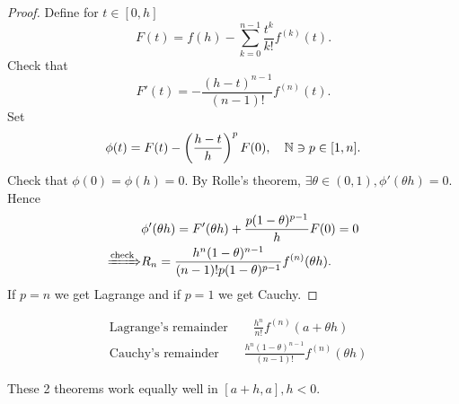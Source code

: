 \begin{proof}
    Define for $ t\in [0,h] $ 
    \[
        F(t) = f(h)-\sum_{k=0}^{n-1}\frac{t^k}{k!}f^{(k)}(t).
    \]
    Check that 
    \[
        F'(t) = - \frac{(h-t)^{n-1}}{(n-1)!}f^{(n)}(t).
    \]
    Set 
    \[
        \phi(t) = F(t) - \left( \frac{h-t}{h} \right)^p F(0),\quad {\mathbb{N}}\ni p \in [1,n].
    \]
    Check that $ \phi(0)=\phi(h)=0 $. By Rolle's theorem, $ \exists \theta\in (0,1), \phi'(\theta h)=0$. Hence
    \begin{align*}
        &\phi'(\theta h) = F'(\theta h) +\frac{p(1-\theta)^{p-1}}{h} F(0)=0\\ 
        \xRightarrow{\text{check}} &R_n=\frac{h^n(1-\theta)^{n-1}}{(n-1)!p(1-\theta)^{p-1}}f^{(n)}(\theta h).
    \end{align*}
    If $p=n$ we get Lagrange and if $p=1$ we get Cauchy.
\end{proof}
\begin{remark}
    \begin{align*}
        &\text{Lagrange's remainder}\qquad  \frac{h^n}{n!}f^{(n)}(a+\theta h)\\ 
        &\text{Cauchy's remainder}\qquad  \frac{h^n(1-\theta)^{n-1}}{(n-1)!}f^{(n)}(\theta h)
    \end{align*}
\end{remark}
\begin{remark}
    These 2 theorems work equally well in $ [a+h,a],h<0 $.
\end{remark}
